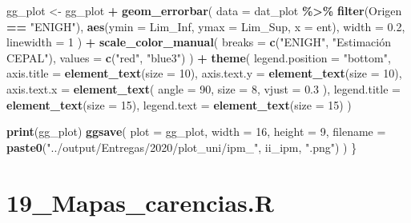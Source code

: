 \documentclass[
  12pt,
]{book}
\newenvironment{Shaded}{\begin{snugshade}}{\end{snugshade}}
\newcommand{\AttributeTok}[1]{\textcolor[rgb]{0.13,0.29,0.53}{#1}}
\newcommand{\DecValTok}[1]{\textcolor[rgb]{0.00,0.00,0.81}{#1}}
\newcommand{\FloatTok}[1]{\textcolor[rgb]{0.00,0.00,0.81}{#1}}
\newcommand{\FunctionTok}[1]{\textcolor[rgb]{0.13,0.29,0.53}{\textbf{#1}}}
\newcommand{\NormalTok}[1]{#1}
\newcommand{\OtherTok}[1]{\textcolor[rgb]{0.56,0.35,0.01}{#1}}
\newcommand{\SpecialCharTok}[1]{\textcolor[rgb]{0.81,0.36,0.00}{\textbf{#1}}}
\newcommand{\StringTok}[1]{\textcolor[rgb]{0.31,0.60,0.02}{#1}}
\begin{document}
\begin{Shaded}
\begin{Highlighting}[]
\NormalTok{  gg\_plot }\OtherTok{\textless{}{-}}\NormalTok{ gg\_plot }\SpecialCharTok{+}
    \FunctionTok{geom\_errorbar}\NormalTok{(}
      \AttributeTok{data =}\NormalTok{ dat\_plot }\SpecialCharTok{\%\textgreater{}\%} \FunctionTok{filter}\NormalTok{(Origen }\SpecialCharTok{==} \StringTok{"ENIGH"}\NormalTok{),}
      \FunctionTok{aes}\NormalTok{(}\AttributeTok{ymin =}\NormalTok{ Lim\_Inf, }\AttributeTok{ymax =}\NormalTok{ Lim\_Sup, }\AttributeTok{x =}\NormalTok{ ent),}
      \AttributeTok{width =} \FloatTok{0.2}\NormalTok{,}
      \AttributeTok{linewidth =} \DecValTok{1}
\NormalTok{    ) }\SpecialCharTok{+}
    \FunctionTok{scale\_color\_manual}\NormalTok{(}
      \AttributeTok{breaks =} \FunctionTok{c}\NormalTok{(}\StringTok{"ENIGH"}\NormalTok{, }\StringTok{"Estimación CEPAL"}\NormalTok{),}
      \AttributeTok{values =} \FunctionTok{c}\NormalTok{(}\StringTok{"red"}\NormalTok{, }\StringTok{"blue3"}\NormalTok{)}
\NormalTok{    ) }\SpecialCharTok{+}
    \FunctionTok{theme}\NormalTok{(}
      \AttributeTok{legend.position =} \StringTok{"bottom"}\NormalTok{,}
      \AttributeTok{axis.title =} \FunctionTok{element\_text}\NormalTok{(}\AttributeTok{size =} \DecValTok{10}\NormalTok{),}
      \AttributeTok{axis.text.y =} \FunctionTok{element\_text}\NormalTok{(}\AttributeTok{size =} \DecValTok{10}\NormalTok{),}
      \AttributeTok{axis.text.x =} \FunctionTok{element\_text}\NormalTok{(}
        \AttributeTok{angle =} \DecValTok{90}\NormalTok{,}
        \AttributeTok{size =} \DecValTok{8}\NormalTok{,}
        \AttributeTok{vjust =} \FloatTok{0.3}
\NormalTok{      ),}
      \AttributeTok{legend.title =} \FunctionTok{element\_text}\NormalTok{(}\AttributeTok{size =} \DecValTok{15}\NormalTok{),}
      \AttributeTok{legend.text =} \FunctionTok{element\_text}\NormalTok{(}\AttributeTok{size =} \DecValTok{15}\NormalTok{)}
\NormalTok{    )}
  
  \FunctionTok{print}\NormalTok{(gg\_plot)}
  \FunctionTok{ggsave}\NormalTok{(}
    \AttributeTok{plot =}\NormalTok{ gg\_plot,}
    \AttributeTok{width =} \DecValTok{16}\NormalTok{,}
    \AttributeTok{height =} \DecValTok{9}\NormalTok{,}
    \AttributeTok{filename =} \FunctionTok{paste0}\NormalTok{(}\StringTok{"../output/Entregas/2020/plot\_uni/ipm\_"}\NormalTok{, ii\_ipm, }\StringTok{".png"}\NormalTok{)}
\NormalTok{  )}
\NormalTok{\}}
\end{Highlighting}
\end{Shaded}

\hypertarget{mapas_carencias.r}{%
\chapter*{19\_Mapas\_carencias.R}\label{mapas_carencias.r}}
\end{document}
